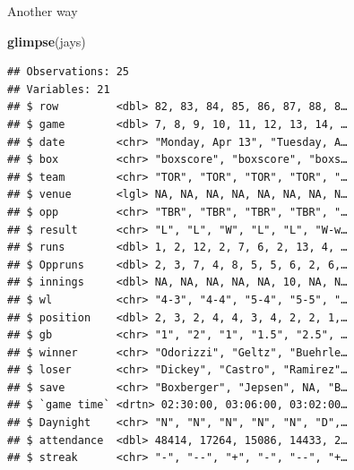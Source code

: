 \documentclass[ignorenonframetext,]{beamer}
\newenvironment{Shaded}{\begin{snugshade}}{\end{snugshade}}
\newcommand{\KeywordTok}[1]{\textcolor[rgb]{0.13,0.29,0.53}{\textbf{#1}}}
\newcommand{\NormalTok}[1]{#1}
\begin{document}
\begin{frame}[fragile]{Another way}
\protect\hypertarget{another-way}{}

\tiny

\begin{Shaded}
\begin{Highlighting}[]
\KeywordTok{glimpse}\NormalTok{(jays)}
\end{Highlighting}
\end{Shaded}

\begin{verbatim}
## Observations: 25
## Variables: 21
## $ row         <dbl> 82, 83, 84, 85, 86, 87, 88, 8…
## $ game        <dbl> 7, 8, 9, 10, 11, 12, 13, 14, …
## $ date        <chr> "Monday, Apr 13", "Tuesday, A…
## $ box         <chr> "boxscore", "boxscore", "boxs…
## $ team        <chr> "TOR", "TOR", "TOR", "TOR", "…
## $ venue       <lgl> NA, NA, NA, NA, NA, NA, NA, N…
## $ opp         <chr> "TBR", "TBR", "TBR", "TBR", "…
## $ result      <chr> "L", "L", "W", "L", "L", "W-w…
## $ runs        <dbl> 1, 2, 12, 2, 7, 6, 2, 13, 4, …
## $ Oppruns     <dbl> 2, 3, 7, 4, 8, 5, 5, 6, 2, 6,…
## $ innings     <dbl> NA, NA, NA, NA, NA, 10, NA, N…
## $ wl          <chr> "4-3", "4-4", "5-4", "5-5", "…
## $ position    <dbl> 2, 3, 2, 4, 4, 3, 4, 2, 2, 1,…
## $ gb          <chr> "1", "2", "1", "1.5", "2.5", …
## $ winner      <chr> "Odorizzi", "Geltz", "Buehrle…
## $ loser       <chr> "Dickey", "Castro", "Ramirez"…
## $ save        <chr> "Boxberger", "Jepsen", NA, "B…
## $ `game time` <drtn> 02:30:00, 03:06:00, 03:02:00…
## $ Daynight    <chr> "N", "N", "N", "N", "N", "D",…
## $ attendance  <dbl> 48414, 17264, 15086, 14433, 2…
## $ streak      <chr> "-", "--", "+", "-", "--", "+…
\end{verbatim}

\normalsize

\end{frame}
\end{document}

